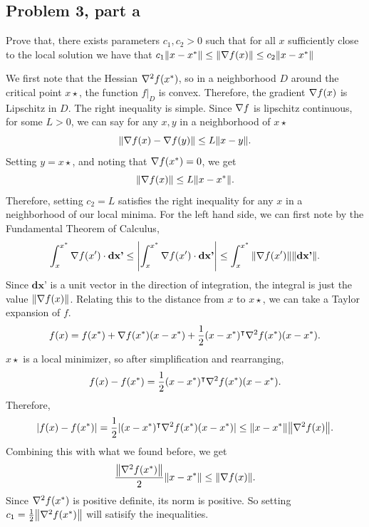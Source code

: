 \subsection{Problem 3, part a}
Prove that, there exists parameters $c_1, c_2 > 0$ such that for all $x$ sufficiently close to the local solution we have that $c_1 \norm{x - x^*} \leq \norm{\nabla f(x)} \leq c_2\norm{x - x^*}$ 
\partbreak
\begin{solution}

    We first note that the Hessian $\nabla ^2 f(x^{*})$, so in a neighborhood $D$ around the critical point $x\star$, the function $f|_{D}$ is convex. Therefore, the gradient $\nabla f(x)$ is Lipschitz in $D$. The right inequality is simple. Since $\nabla f$ is lipschitz continuous, for some $L > 0$, we can say for any $x, y$ in a neighborhood of $x\star$
    \[\norm{\nabla f(x) - \nabla f(y)} \leq L \norm{x - y}.\]
    Setting $y = x\star$, and noting that $\nabla f(x^{*}) = 0$, we get 
    \[\norm{\nabla f(x)} \leq L \norm{x - x^{*}}.\]
    Therefore, setting $c_2 = L$ satisfies the right inequality for any $x$ in a neighborhood of our local minima. For the left hand side, we can first note by the Fundamental Theorem of Calculus, 
    \[\int_x^{x^{*}} \nabla f(x') \cdot \textbf{dx'} \leq \left | \int_x^{x^{*}} \nabla f(x') \cdot \textbf{dx'} \right | \leq \int_x^{x^{*}} \norm{\nabla f(x')} \norm{\textbf{dx'}}.\]
    Since $\textbf{dx'}$ is a unit vector in the direction of integration, the integral is just the value $\norm{\nabla f(x)}$. Relating this to the distance from $x$ to $x\star$, we can take a Taylor expansion of $f$.
    \[f(x) = f(x^{*}) + \nabla f(x^{*})(x - x^{*}) + \frac{1}{2}(x - x^{*})^\intercal \nabla^2 f(x^{*})(x - x^{*}).\]
    $x\star$ is a local minimizer, so after simplification and rearranging,
    \[f(x) - f(x^{*}) = \frac{1}{2}(x - x^{*})^\intercal \nabla^2 f(x^{*})(x - x^{*}).\]
    Therefore, 
    \[|f(x) - f(x^{*})| = \frac{1}{2}|(x - x^{*})^\intercal \nabla^2 f(x^{*})(x - x^{*})| \leq \norm{x - x^{*}}\norm{\nabla^2 f(x)}.\]
    Combining this with what we found before, we get
    \[\frac{\norm{\nabla^2f(x^{*})}}{2}\norm{x - x^{*}} \leq \norm{\nabla f(x)}.\]
    Since $\nabla^2f(x^{*})$ is positive definite, its norm is positive. So setting $c_1 = \frac{1}{2}\norm{\nabla^2f(x^{*})}$ will satisify the inequalities. 
\end{solution}
\newpage
